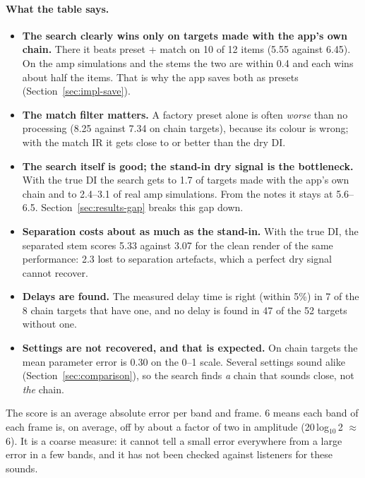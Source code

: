 \paragraph{What the table says.}
\begin{itemize}
\item \textbf{The search clearly wins only on targets made with the app's own
  chain.} There it beats preset + match on 10 of 12 items (5.55 against
  6.45\dB). On the amp simulations and the stems the two are within 0.4\dB{}
  and each wins about half the items. That is why the app saves both as presets
  (Section~\ref{sec:impl-save}).
\item \textbf{The match filter matters.} A factory preset alone is often
  \emph{worse} than no processing (8.25 against 7.34 on chain targets), because
  its colour is wrong; with the match IR it gets close to or better than the dry
  DI.
\item \textbf{The search itself is good; the stand-in dry signal is the
  bottleneck.} With the true DI the search gets to 1.7\dB{} of targets made
  with the app's own chain and to 2.4--3.1\dB{} of real amp simulations. From
  the notes it stays at 5.6--6.5\dB. Section~\ref{sec:results-gap} breaks this
  gap down.
\item \textbf{Separation costs about as much as the stand-in.} With the true DI,
  the separated stem scores 5.33\dB{} against 3.07 for the clean render of the
  same performance: 2.3\dB{} lost to separation artefacts, which a perfect dry
  signal cannot recover.
\item \textbf{Delays are found.} The measured delay time is right (within 5\%)
  in 7 of the 8 chain targets that have one, and no delay is found in 47 of the
  52 targets without one.
\item \textbf{Settings are not recovered, and that is expected.} On chain targets
  the mean parameter error is 0.30 on the 0--1 scale. Several settings sound
  alike (Section~\ref{sec:comparison}), so the search finds \emph{a} chain that
  sounds close, not \emph{the} chain.
\end{itemize}

\begin{worked}
The score is an average absolute error per band and frame. 6\dB{} means each
band of each frame is, on average, off by about a factor of two in amplitude
(20\,log$_{10}$\,2 $\approx$ 6\dB). It is a coarse measure: it cannot tell a
small error everywhere from a large error in a few bands, and it has not been
checked against listeners for these sounds.
\end{worked}

